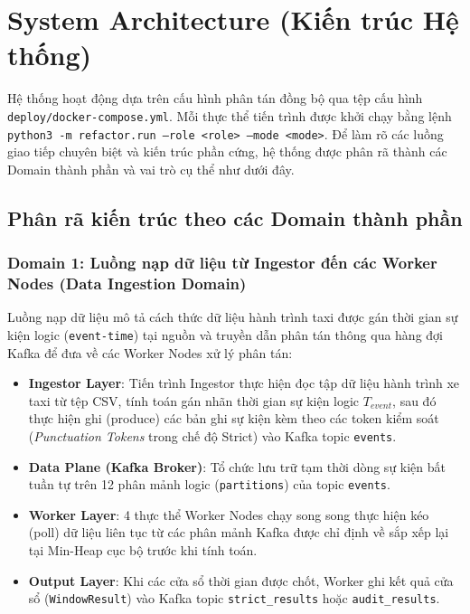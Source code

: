 \documentclass[12pt,a4paper]{article}
\begin{document}
\section{System Architecture (Kiến trúc Hệ thống)}

Hệ thống hoạt động dựa trên cấu hình phân tán đồng bộ qua tệp cấu hình \texttt{deploy/docker-compose.yml}. Mỗi thực thể tiến trình được khởi chạy bằng lệnh \texttt{python3 -m refactor.run --role <role> --mode <mode>}. Để làm rõ các luồng giao tiếp chuyên biệt và kiến trúc phần cứng, hệ thống được phân rã thành các Domain thành phần và vai trò cụ thể như dưới đây.

\subsection{Phân rã kiến trúc theo các Domain thành phần}

\subsubsection{Domain 1: Luồng nạp dữ liệu từ Ingestor đến các Worker Nodes (Data Ingestion Domain)}
Luồng nạp dữ liệu mô tả cách thức dữ liệu hành trình taxi được gán thời gian sự kiện logic (\texttt{event-time}) tại nguồn và truyền dẫn phân tán thông qua hàng đợi Kafka để đưa về các Worker Nodes xử lý phân tán:
\begin{itemize}[leftmargin=*]
    \item \textbf{Ingestor Layer}: Tiến trình Ingestor thực hiện đọc tập dữ liệu hành trình xe taxi từ tệp CSV, tính toán gán nhãn thời gian sự kiện logic $T_{event}$, sau đó thực hiện ghi (produce) các bản ghi sự kiện kèm theo các token kiểm soát (\textit{Punctuation Tokens} trong chế độ Strict) vào Kafka topic \texttt{events}.
    \item \textbf{Data Plane (Kafka Broker)}: Tổ chức lưu trữ tạm thời dòng sự kiện bất tuần tự trên 12 phân mảnh logic (\texttt{partitions}) của topic \texttt{events}.
    \item \textbf{Worker Layer}: 4 thực thể Worker Nodes chạy song song thực hiện kéo (poll) dữ liệu liên tục từ các phân mảnh Kafka được chỉ định về sắp xếp lại tại Min-Heap cục bộ trước khi tính toán.
    \item \textbf{Output Layer}: Khi các cửa sổ thời gian được chốt, Worker ghi kết quả cửa sổ (\texttt{WindowResult}) vào Kafka topic \texttt{strict\_results} hoặc \texttt{audit\_results}.
\end{itemize}
\end{document}
